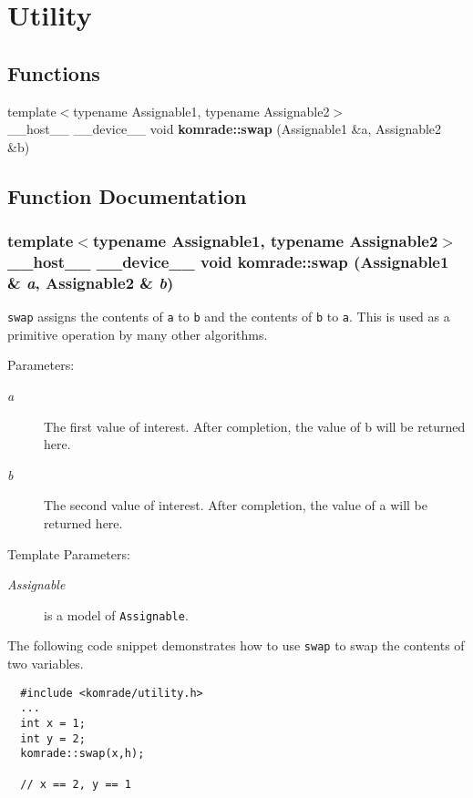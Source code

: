 \section{Utility}
\label{group__utility}
\subsection*{Functions}
\begin{CompactItemize}
\item 
{\footnotesize template$<$typename Assignable1, typename Assignable2$>$ }\\\_\-\_\-host\_\-\_\- \_\-\_\-device\_\-\_\- void {\bf komrade::swap} (Assignable1 \&a, Assignable2 \&b)
\end{CompactItemize}


\subsection{Function Documentation}
\subsubsection[swap]{\setlength{\rightskip}{0pt plus 5cm}template$<$typename Assignable1, typename Assignable2$>$ \_\-\_\-host\_\-\_\- \_\-\_\-device\_\-\_\- void komrade::swap (Assignable1 \& {\em a}, \/  Assignable2 \& {\em b})\hspace{0.3cm}{\tt  [inline]}}\label{group__utility_g9b1d6e2dffcef4f1815ff019c7351c20}


{\tt swap} assigns the contents of {\tt a} to {\tt b} and the contents of {\tt b} to {\tt a}. This is used as a primitive operation by many other algorithms.

\begin{Desc}
\item[Parameters:]
\begin{description}
\item[{\em a}]The first value of interest. After completion, the value of b will be returned here. \item[{\em b}]The second value of interest. After completion, the value of a will be returned here.\end{description}
\end{Desc}
\begin{Desc}
\item[Template Parameters:]
\begin{description}
\item[{\em Assignable}]is a model of {\tt Assignable}.\end{description}
\end{Desc}
The following code snippet demonstrates how to use {\tt swap} to swap the contents of two variables.



\begin{Code}\begin{verbatim}  #include <komrade/utility.h>
  ...
  int x = 1;
  int y = 2;
  komrade::swap(x,h);

  // x == 2, y == 1
\end{verbatim}
\end{Code}

 